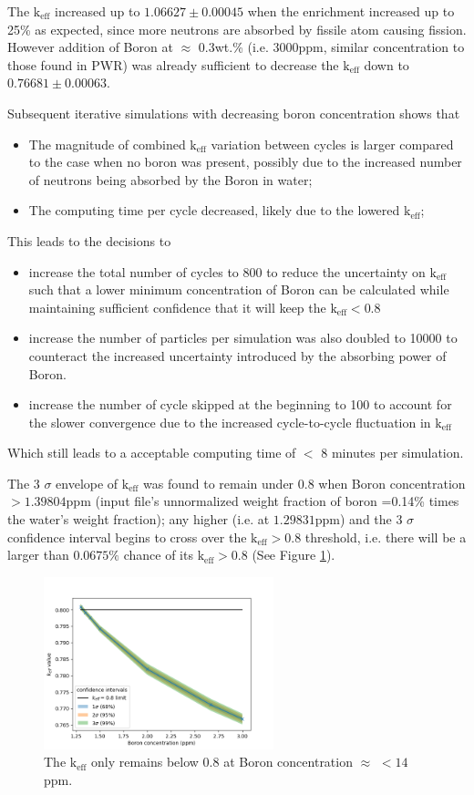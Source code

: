 \documentclass[a4paper, 12pt]{article}
\begin{document}
The $\text{k}_{\text{eff}}$ increased up to $1.06627 \pm 0.00045$ when the enrichment increased up to 25\% as expected, since more neutrons are absorbed by fissile atom causing fission. However addition of Boron at $\approx$ 0.3wt.\% (i.e. 3000ppm, similar concentration to those found in PWR) was already sufficient to decrease the $\text{k}_{\text{eff}}$ down to $0.76681 \pm 0.00063$.

Subsequent iterative simulations with decreasing boron concentration shows that
\begin{itemize}
 	\item The magnitude of combined $\text{k}_{\text{eff}}$ variation between cycles is larger compared to the case when no boron was present, possibly due to the increased number of neutrons being absorbed by the Boron in water;
	\item The computing time per cycle decreased, likely due to the lowered $\text{k}_{\text{eff}}$;
\end{itemize} 
This leads to the decisions to 
\begin{itemize}
	\item increase the total number of cycles to 800 to reduce the uncertainty on $\text{k}_{\text{eff}}$ such that a lower minimum concentration of Boron can be calculated while maintaining sufficient confidence that it will keep the $\text{k}_{\text{eff}} < 0.8 $
	\item increase the number of particles per simulation was also doubled to 10000 to counteract the increased uncertainty introduced by the absorbing power of Boron.
	\item increase the number of cycle skipped at the beginning to 100 to account for the slower convergence due to the increased cycle-to-cycle fluctuation in $\text{k}_{\text{eff}}$
\end{itemize}
Which still leads to a acceptable computing time of $<$ 8 minutes per simulation.

The 3 $\sigma$ envelope of $\text{k}_{\text{eff}}$ was found to remain under 0.8 when Boron concentration $>1.39804$ppm (input file's unnormalized weight fraction of boron =0.14\% times the water's weight fraction); any higher (i.e. at $1.29831$ppm) and the 3 $\sigma$ confidence interval begins to cross over the $\text{k}_{\text{eff}}>0.8$ threshold, i.e. there will be a larger than $0.0675 \%$ chance of its $\text{k}_{\text{eff}} >0.8$ (See Figure \ref{ConfInt}).

\begin{figure}[H]
\centering
\includegraphics[height=5cm]{ConfidenceInterval.png}
\caption{The $\text{k}_{\text{eff}}$ only remains below 0.8 at Boron concentration $\approx$ $<14$ ppm.
}\label{ConfInt}
\end{figure}
\end{document}
